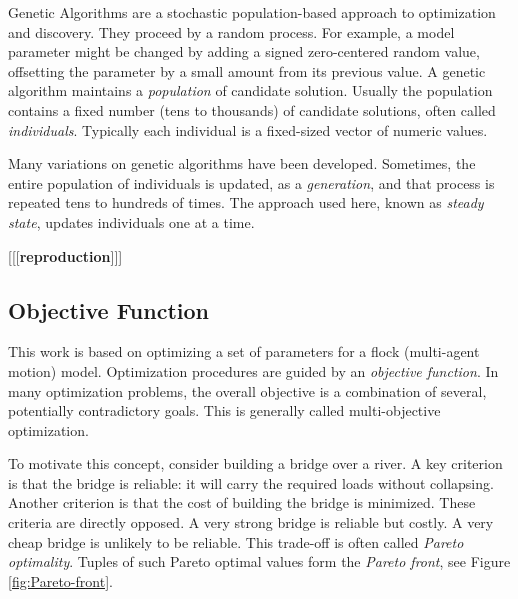 \documentclass[letterpaper]{article}
\begin{document}
Genetic Algorithms are a stochastic population-based approach to optimization and discovery. They proceed by a random process. For example, a model parameter might be changed by adding a signed zero-centered random value, offsetting the parameter by a small amount from its previous value. A genetic algorithm maintains a \textit{population} of candidate solution. Usually the population contains a fixed number (tens to thousands) of candidate solutions, often called \textit{individuals}. Typically each individual is a fixed-sized vector of numeric values.

Many variations on genetic algorithms have been developed. Sometimes, the entire population of individuals is updated, as a \textit{generation}, and that process is repeated tens to hundreds of times. The approach used here, known as \textit{steady state}, updates individuals one at a time.

[[[\textbf{reproduction}]]]

\subsection{Objective Function}
\label{subsec:Objective_Function}

This work is based on optimizing a set of parameters for a flock (multi-agent motion) model. Optimization procedures are guided by an \textit{objective function}. In many optimization problems, the overall objective is a combination of several, potentially contradictory goals. This is generally called multi-objective optimization. 
\par

To motivate this concept, consider building a bridge over a river. A key criterion is that the bridge is reliable: it will carry the required loads without collapsing. Another criterion is that the cost of building the bridge is minimized. These criteria are directly opposed. A very strong bridge is reliable but costly. A very cheap bridge is unlikely to be reliable. This trade-off is often called \textit{Pareto optimality}. Tuples of such Pareto optimal values form the \textit{Pareto front}, see Figure \ref{fig:Pareto-front}.
\par
\end{document}
